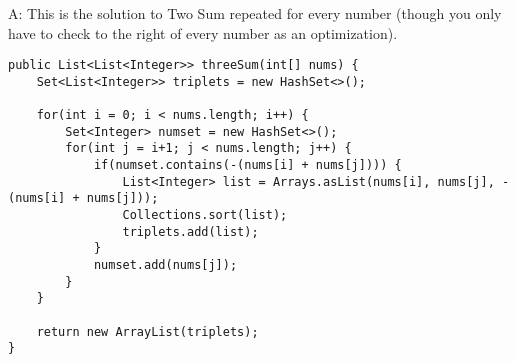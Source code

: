 \documentclass[8pt, table, xcdraw]{article}%
\begin{document}
A: This is the solution to Two Sum repeated for every number (though you only have to check to the right of every number as an optimization).

\begin{lstlisting}
public List<List<Integer>> threeSum(int[] nums) {
    Set<List<Integer>> triplets = new HashSet<>();

    for(int i = 0; i < nums.length; i++) {
        Set<Integer> numset = new HashSet<>();
        for(int j = i+1; j < nums.length; j++) {
            if(numset.contains(-(nums[i] + nums[j]))) {
                List<Integer> list = Arrays.asList(nums[i], nums[j], -(nums[i] + nums[j]));
                Collections.sort(list);
                triplets.add(list);
            }
            numset.add(nums[j]);
        }
    }

    return new ArrayList(triplets);
}
\end{lstlisting}
\end{document}
